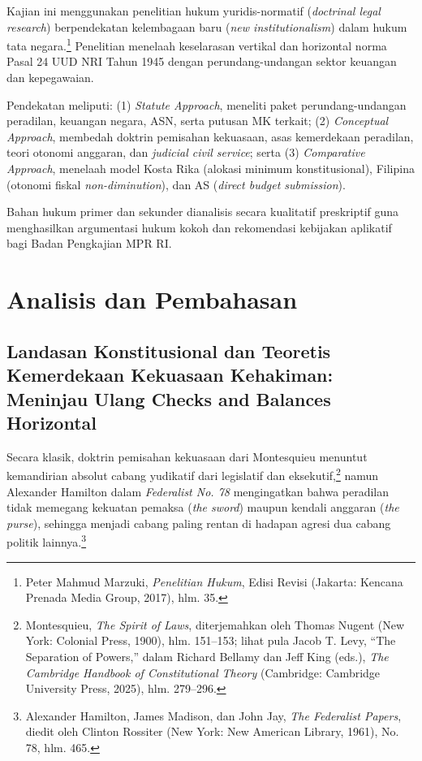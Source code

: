 \documentclass[12pt,a4paper,twocolumn]{article}
\begin{document}
Kajian ini menggunakan penelitian hukum yuridis-normatif (\textit{doctrinal legal research}) berpendekatan kelembagaan baru (\textit{new institutionalism}) dalam hukum tata negara.\footnote{Peter Mahmud Marzuki, \textit{Penelitian Hukum}, Edisi Revisi (Jakarta: Kencana Prenada Media Group, 2017), hlm. 35.} Penelitian menelaah keselarasan vertikal dan horizontal norma Pasal 24 UUD NRI Tahun 1945 dengan perundang-undangan sektor keuangan dan kepegawaian.

Pendekatan meliputi: (1) \textit{Statute Approach}, meneliti paket perundang-undangan peradilan, keuangan negara, ASN, serta putusan MK terkait; (2) \textit{Conceptual Approach}, membedah doktrin pemisahan kekuasaan, asas kemerdekaan peradilan, teori otonomi anggaran, dan \textit{judicial civil service}; serta (3) \textit{Comparative Approach}, menelaah model Kosta Rika (alokasi minimum konstitusional), Filipina (otonomi fiskal \textit{non-diminution}), dan AS (\textit{direct budget submission}).

Bahan hukum primer dan sekunder dianalisis secara kualitatif preskriptif guna menghasilkan argumentasi hukum kokoh dan rekomendasi kebijakan aplikatif bagi Badan Pengkajian MPR RI.

\section{Analisis dan Pembahasan}

\subsection{Landasan Konstitusional dan Teoretis Kemerdekaan Kekuasaan Kehakiman: Meninjau Ulang Checks and Balances Horizontal}

Secara klasik, doktrin pemisahan kekuasaan dari Montesquieu menuntut kemandirian absolut cabang yudikatif dari legislatif dan eksekutif,\footnote{Montesquieu, \textit{The Spirit of Laws}, diterjemahkan oleh Thomas Nugent (New York: Colonial Press, 1900), hlm. 151--153; lihat pula Jacob T. Levy, ``The Separation of Powers,'' dalam Richard Bellamy dan Jeff King (eds.), \textit{The Cambridge Handbook of Constitutional Theory} (Cambridge: Cambridge University Press, 2025), hlm. 279--296.} namun Alexander Hamilton dalam \textit{Federalist No. 78} mengingatkan bahwa peradilan tidak memegang kekuatan pemaksa (\textit{the sword}) maupun kendali anggaran (\textit{the purse}), sehingga menjadi cabang paling rentan di hadapan agresi dua cabang politik lainnya.\footnote{Alexander Hamilton, James Madison, dan John Jay, \textit{The Federalist Papers}, diedit oleh Clinton Rossiter (New York: New American Library, 1961), No. 78, hlm. 465.}
\end{document}
